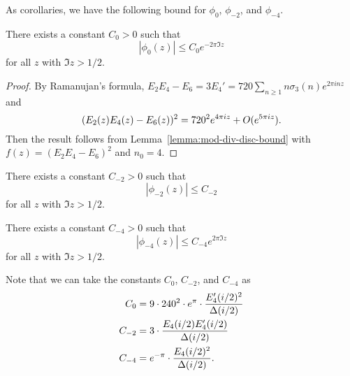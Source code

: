 As corollaries, we have the following bound for $\phi_0$, $\phi_{-2}$, and $\phi_{-4}$.

\begin{corollary}\label{cor:phi0-bound}
There exists a constant $C_0 > 0$ such that
\begin{equation}\label{eqn:phi0-bound}
|\phi_0(z)| \le C_0 e^{-2 \pi \Im z}
\end{equation}
for all $z$ with $\Im z > 1/2$.
\end{corollary}
\begin{proof}
By Ramanujan's formula, $E_2 E_4 - E_6 = 3E_4' = 720 \sum_{n \ge 1} n \sigma_3(n) e^{2 \pi i n z}$ and
\begin{equation}
    (E_2(z) E_4(z) - E_6(z))^{2} = 720^{2} e^{4 \pi i z} + O(e^{5 \pi i z}). \notag
\end{equation}
Then the result follows from Lemma~\ref{lemma:mod-div-disc-bound} with $f(z) = (E_2 E_4 - E_6)^2$ and $n_0 = 4$.
\end{proof}

\begin{corollary}\label{cor:phi2-bound}
There exists a constant $C_{-2} > 0$ such that
\begin{equation}\label{eqn:phi2-bound}
    |\phi_{-2}(z)| \le C_{-2}
\end{equation}
for all $z$ with $\Im z > 1/2$.
\end{corollary}

\begin{corollary}\label{cor:phi4-bound}
There exists a constant $C_{-4} > 0$ such that
\begin{equation}\label{eqn:phi4-bound}
    |\phi_{-4}(z)| \le C_{-4} e^{2 \pi \Im z}
\end{equation}
for all $z$ with $\Im z > 1/2$.
\end{corollary}

Note that we can take the constants $C_0$, $C_{-2}$, and $C_{-4}$ as
\begin{align}
    C_0 &= 9 \cdot 240^2 \cdot e^{\pi} \cdot \frac{E_4'(i/2)^{2}}{\Delta(i/2)} \notag \\
    C_{-2} &= 3 \cdot \frac{E_4(i/2) E_4'(i/2)}{\Delta(i/2)} \notag \\
    C_{-4} &= e^{-\pi} \cdot \frac{E_4(i/2)^{2}}{\Delta(i/2)}. \notag
\end{align}

